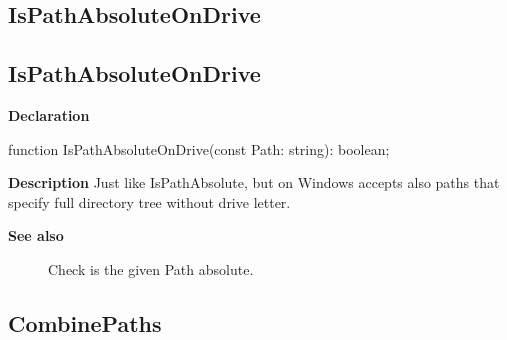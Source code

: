 \documentclass{report}
\newif\ifpdf
\begin{document}
\subsection*{\large{\textbf{IsPathAbsoluteOnDrive}}\normalsize\hspace{1ex}\hrulefill}
\else
\subsection*{IsPathAbsoluteOnDrive}
\fi
\label{PasDoc_Utils-IsPathAbsoluteOnDrive}
\begin{list}{}{
\setlength{\itemindent}{0cm}
\setlength{\listparindent}{0cm}
\setlength{\leftmargin}{\evensidemargin}
\addtolength{\leftmargin}{\tmplength}
\settowidth{\labelsep}{X}
\addtolength{\leftmargin}{\labelsep}
\setlength{\labelwidth}{\tmplength}
}
\item[\textbf{Declaration}\hfill]
\ifpdf
\begin{flushleft}
\fi
\begin{ttfamily}
function IsPathAbsoluteOnDrive(const Path: string): boolean;\end{ttfamily}

\ifpdf
\end{flushleft}
\fi

\par
\item[\textbf{Description}]
Just like IsPathAbsolute, but on Windows accepts also paths that specify full directory tree without drive letter.

\item[\textbf{See also}]
\begin{description}
\item[\begin{ttfamily}IsPathAbsolute\end{ttfamily}(\ref{PasDoc_Utils-IsPathAbsolute})] 
Check is the given Path absolute.
\end{description}


\end{list}
\ifpdf
\subsection*{\large{\textbf{CombinePaths}}\normalsize\hspace{1ex}\hrulefill}
\else
\end{document}
